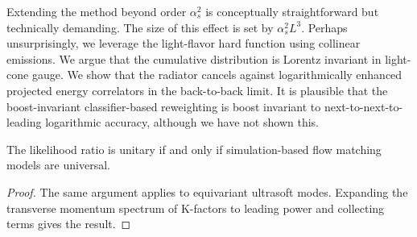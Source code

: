 Extending the method beyond order $\alpha_s^2$ is conceptually
straightforward but technically demanding. The size of this effect is
set by $\alpha_s^2 L^3$. Perhaps unsurprisingly, we leverage the
light-flavor hard function using collinear emissions. We argue that the
cumulative distribution is Lorentz invariant in light-cone gauge. We
show that the radiator cancels against logarithmically enhanced
projected energy correlators in the back-to-back limit. It is plausible
that the boost-invariant classifier-based reweighting is boost invariant
to next-to-next-to-leading logarithmic accuracy, although we have not
shown this.

\begin{proposition}\label{thm:3}
The likelihood ratio is unitary if and only if simulation-based flow
matching models are universal.
\end{proposition}

\begin{proof}
The same argument applies to equivariant ultrasoft modes. Expanding the
transverse momentum spectrum of K-factors to leading power and
collecting terms gives the result.
\end{proof}

